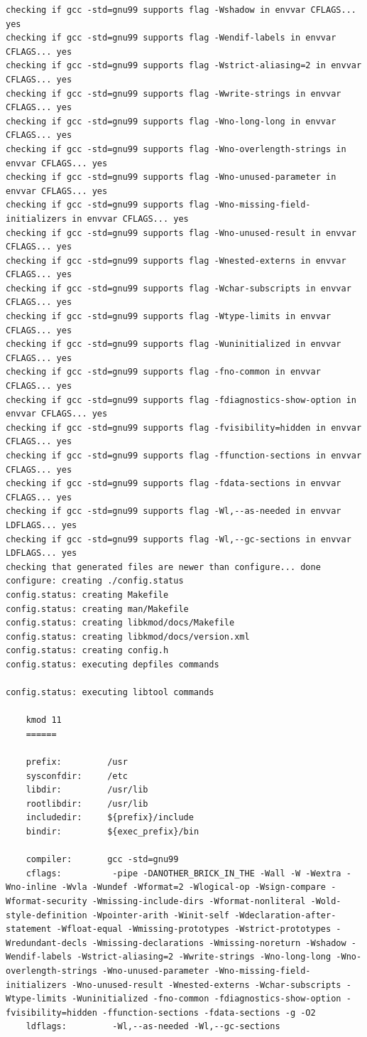 \documentclass[11pt,a4paper]{article}
\begin{document}
{\begin{shaded}
\begin{verbatim}
checking if gcc -std=gnu99 supports flag -Wshadow in envvar CFLAGS... yes
checking if gcc -std=gnu99 supports flag -Wendif-labels in envvar CFLAGS... yes
checking if gcc -std=gnu99 supports flag -Wstrict-aliasing=2 in envvar CFLAGS... yes
checking if gcc -std=gnu99 supports flag -Wwrite-strings in envvar CFLAGS... yes
checking if gcc -std=gnu99 supports flag -Wno-long-long in envvar CFLAGS... yes
checking if gcc -std=gnu99 supports flag -Wno-overlength-strings in envvar CFLAGS... yes
checking if gcc -std=gnu99 supports flag -Wno-unused-parameter in envvar CFLAGS... yes
checking if gcc -std=gnu99 supports flag -Wno-missing-field-initializers in envvar CFLAGS... yes
checking if gcc -std=gnu99 supports flag -Wno-unused-result in envvar CFLAGS... yes
checking if gcc -std=gnu99 supports flag -Wnested-externs in envvar CFLAGS... yes
checking if gcc -std=gnu99 supports flag -Wchar-subscripts in envvar CFLAGS... yes
checking if gcc -std=gnu99 supports flag -Wtype-limits in envvar CFLAGS... yes
checking if gcc -std=gnu99 supports flag -Wuninitialized in envvar CFLAGS... yes
checking if gcc -std=gnu99 supports flag -fno-common in envvar CFLAGS... yes
checking if gcc -std=gnu99 supports flag -fdiagnostics-show-option in envvar CFLAGS... yes
checking if gcc -std=gnu99 supports flag -fvisibility=hidden in envvar CFLAGS... yes
checking if gcc -std=gnu99 supports flag -ffunction-sections in envvar CFLAGS... yes
checking if gcc -std=gnu99 supports flag -fdata-sections in envvar CFLAGS... yes
checking if gcc -std=gnu99 supports flag -Wl,--as-needed in envvar LDFLAGS... yes
checking if gcc -std=gnu99 supports flag -Wl,--gc-sections in envvar LDFLAGS... yes
checking that generated files are newer than configure... done
configure: creating ./config.status
config.status: creating Makefile
config.status: creating man/Makefile
config.status: creating libkmod/docs/Makefile
config.status: creating libkmod/docs/version.xml
config.status: creating config.h
config.status: executing depfiles commands

config.status: executing libtool commands

    kmod 11
    ======

    prefix:         /usr
    sysconfdir:     /etc
    libdir:         /usr/lib
    rootlibdir:     /usr/lib
    includedir:     ${prefix}/include
    bindir:         ${exec_prefix}/bin

    compiler:       gcc -std=gnu99
    cflags:          -pipe -DANOTHER_BRICK_IN_THE -Wall -W -Wextra -Wno-inline -Wvla -Wundef -Wformat=2 -Wlogical-op -Wsign-compare -Wformat-security -Wmissing-include-dirs -Wformat-nonliteral -Wold-style-definition -Wpointer-arith -Winit-self -Wdeclaration-after-statement -Wfloat-equal -Wmissing-prototypes -Wstrict-prototypes -Wredundant-decls -Wmissing-declarations -Wmissing-noreturn -Wshadow -Wendif-labels -Wstrict-aliasing=2 -Wwrite-strings -Wno-long-long -Wno-overlength-strings -Wno-unused-parameter -Wno-missing-field-initializers -Wno-unused-result -Wnested-externs -Wchar-subscripts -Wtype-limits -Wuninitialized -fno-common -fdiagnostics-show-option -fvisibility=hidden -ffunction-sections -fdata-sections -g -O2
    ldflags:         -Wl,--as-needed -Wl,--gc-sections 


\end{verbatim}
\end{shaded}}
\end{document}
